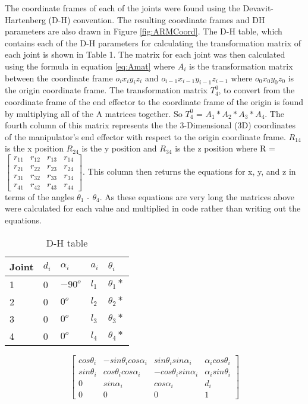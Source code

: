 The coordinate frames of each of the joints were found using the Devavit-Hartenberg (D-H) convention. The resulting coordinate frames and DH parameters are also drawn in Figure \ref{fig:ARMCoord}. The D-H table, which contains each of the D-H parameters for calculating the transformation matrix of each joint is shown in Table 1. The matrix for each joint was then calculated using the formula in equation \ref{eq:Amat} where $A_i$ is the transformation matrix between the coordinate frame $o_ix_iy_iz_i$ and $o_{i-1}x_{i-1}y_{i-1}z_{i-1}$ where $o_0x_0y_0z_0$ is the origin coordinate frame. The transformation matrix $T_4^0$, to convert from the coordinate frame of the end effector to the coordinate frame of the origin is found by multiplying all of the A matrices together. So $T_4^0$ = $A_1*A_2*A_3*A_4$. The fourth column of this matrix represents the the 3-Dimensional (3D) coordinates of the manipulator's end effector with respect to the origin coordinate frame. $R_{14}$ is the x position $R_{24}$ is the y position and $R_{34}$ is the z position where R = $\begin{bmatrix}
  r_{11} & r_{12} & r_{13} & r_{14} \\
  r_{21} & r_{22} & r_{23} & r_{24}\\
  r_{31} & r_{32} & r_{33} & r_{34} \\
  r_{41} & r_{42} & r_{43} & r_{44}
 \end{bmatrix}$. This column then returns the equations for x, y, and z in terms of the angles $\theta_1$ - $\theta_4$. As these equations are very long the matrices above were calculated for each value and multiplied in code rather than writing out the equations.
\begin{table}
\centering
\begin{tabular}{| l | l | l | l | l |}
 		\hline
 		Joint & $d_i$ & $\alpha_i$ & $a_i$ & $\theta_i$ \\ \hline
 		1 & 0 & $-90^o$ & $l_1$ & $\theta_1*$\\ \hline
 		2 & 0 & $0^o$ & $l_2$ & $\theta_2*$\\ \hline
 		3 & 0 & $0^o$ & $l_3$ & $\theta_3*$\\ \hline
 		4 & 0 & $0^o$ & $l_4$ & $\theta_4*$\\ \hline
	\end{tabular}
	\label{table:DH}
	\caption{D-H table}
\end{table}

\begin{equation}
\label{eq:Amat}
\begin{bmatrix}
  cos\theta_i & -sin\theta_icos\alpha_i & sin\theta_isin\alpha_i & \alpha_icos\theta_i \\
  sin\theta_i & cos\theta_icos\alpha_i & -cos\theta_isin\alpha_i & \alpha_isin\theta_i\\
  0 & sin\alpha_i & cos\alpha_i & d_i \\
  0 & 0 & 0 & 1
 \end{bmatrix}
\end{equation}

